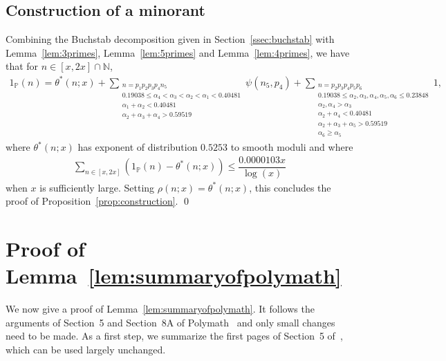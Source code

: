 \documentclass{amsart}
\numberwithin{equation}{section}
\begin{document}
\subsection{Construction of a minorant}

Combining the Buchstab decomposition given in Section~\ref{ssec:buchstab} with Lemma~\ref{lem:3primes}, Lemma~\ref{lem:5primes} and Lemma~\ref{lem:4primes}, we have that for $n \in [x,2x]\cap \mathbb{N}$, 
\begin{align*}
1_{\mathbb{P}}(n) = \theta^*(n;x) + \sum_{\substack{ n = p_1p_2p_3p_4n_5 \\ 0.19038\leq \alpha_4 < \alpha_3 < \alpha_2 < \alpha_1 < 0.40481 \\ \alpha_1+\alpha_2 < 0.40481 \\ \alpha_2+\alpha_3+\alpha_4 >0.59519}} \psi(n_5, p_4)+ \sum_{\substack{ n = p_2p_3p_4p_5p_6 \\ 0.19038 \leq \alpha_2, \alpha_3, \alpha_4, \alpha_5, \alpha_6 \leq 0.23848  \\ \alpha_2, \alpha_4 > \alpha_3  \\ \alpha_2+\alpha_4 < 0.40481\\ \alpha_2 + \alpha_3 + \alpha_5 >0.59519 \\   \alpha_6 \geq \alpha_5 }} 1,
\end{align*}
where $\theta^*(n;x)$ has exponent of distribution $0.5253$ to smooth moduli and where 
\begin{align*}
\sum_{n \in [x,2x]} (1_{\mathbb{P}}(n) - \theta^*(n;x)) \leq  \dfrac{0.0000103x}{\log(x)}
\end{align*}
when $x$ is sufficiently large. Setting $\rho(n;x) =  \theta^*(n;x)$, this concludes the proof of Proposition~\ref{prop:construction}. \qed

\appendix

\section{Proof of Lemma~\ref{lem:summaryofpolymath}} 

We now give a proof of Lemma~\ref{lem:summaryofpolymath}. It follows the arguments of Section~5  and Section~8A  of Polymath~\cite{Polymath:2014:EDZ} and only small changes need to be made. As a first step, we summarize  the first pages of Section~5 of~\cite{Polymath:2014:EDZ}, which can be used largely unchanged.
\end{document}
